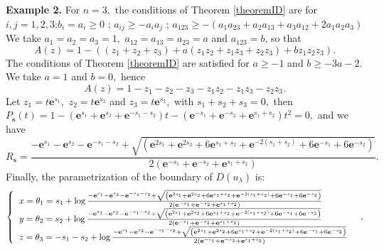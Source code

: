 \documentclass[a4paper,oneside,notitlepage]{article}%
\begin{document}
\textbf{Example 2. }For $n=3,$ the conditions of Theorem \ref{theoremID} are
for $i,j=1,2,3$:\newline$b_{i}=a_{i}\geqslant0$ ; $a_{ij}\geqslant-a_{i}a_{j}$
; $a_{123}\geqslant-\left(  a_{1}a_{23}+a_{2}a_{13}+a_{3}a_{12}+2a_{1}%
a_{2}a_{3}\right)  $\newline We take $a_{1}=a_{2}=a_{3}=1,$ $a_{12}%
=a_{13}=a_{23}=a$ and $a_{123}=b$, so that
\[
A\left(  z\right)  =1-\left(  \left(  z_{1}+z_{2}+z_{3}\right)  +a\left(
z_{1}z_{2}+z_{1}z_{3}+z_{2}z_{3}\right)  +bz_{1}z_{2}z_{3}\right)  .
\]
The conditions of Theorem \ref{theoremID} are satisfied for $a\geqslant-1$ and
$b\geqslant-3a-2.$ We take $a=1$ and $b=0,$ hence
\[
A\left(  z\right)  =1-z_{1}-z_{2}-z_{3}-z_{1}z_{2}-z_{1}z_{3}-z_{2}z_{3}.
\]
Let $z_{1}=t\mathbf{e}^{s_{1}},$ $z_{2}=t\mathbf{e}^{s_{2}}$ and
$z_{3}=t\mathbf{e}^{s_{2}},$ with $s_{1}+s_{2}+s_{3}=0,$ then $P_{\mathbf{s}%
}\left(  t\right)  =1-\left(  \mathbf{e}^{s_{1}}+\mathbf{e}^{s_{2}}%
+\mathbf{e}^{-s_{1}-s_{2}}\right)  t-\left(  \mathbf{e}^{-s_{1}}%
+\mathbf{e}^{-s_{2}}+\mathbf{e}^{s_{1}+s_{2}}\right)  t^{2}=0,$ and we have
\[
R_{\mathbf{s}}=\frac{-\mathbf{e}^{s_{1}}-\mathbf{e}^{s_{2}}-\mathbf{e}%
^{-s_{1}-s_{2}}+\sqrt{\left(  \mathbf{e}^{2s_{1}}+\mathbf{e}^{2s_{2}%
}+6\mathbf{e}^{s_{1}+s_{2}}+\mathbf{e}^{-2(s_{1}+s_{2})}+6\mathbf{e}^{-s_{1}%
}+6\mathbf{e}^{-s_{2}}\right)  }}{2\left(  \mathbf{e}^{-s_{1}}+\mathbf{e}%
^{-s_{2}}+\mathbf{e}^{s_{1}+s_{2}}\right)  }.
\]
Finally, the parametrization of the boundary of $D\left(  u_{\lambda}\right)
$ is:%
\[
\left\{
\begin{tabular}
[c]{l}%
$x=\theta_{1}=s_{1}+\log\frac{-\mathbf{e}^{s_{1}}-\mathbf{e}^{s_{2}%
}-\mathbf{e}^{-s_{1}-s_{2}}+\sqrt{\left(  \mathbf{e}^{2s_{1}}+\mathbf{e}%
^{2s_{2}}+6\mathbf{e}^{s_{1}+s_{2}}+\mathbf{e}^{-2(s_{1}+s_{2})}%
+6\mathbf{e}^{-s_{1}}+6\mathbf{e}^{-s_{2}}\right)  }}{2\left(  \mathbf{e}%
^{-s_{1}}+\mathbf{e}^{-s_{2}}+\mathbf{e}^{s_{1}+s_{2}}\right)  }$\\
$y=\theta_{2}=s_{2}+\log\frac{-\mathbf{e}^{s_{1}}-\mathbf{e}^{s_{2}%
}-\mathbf{e}^{-s_{1}-s_{2}}+\sqrt{\left(  \mathbf{e}^{2s_{1}}+\mathbf{e}%
^{2s_{2}}+6\mathbf{e}^{s_{1}+s_{2}}+\mathbf{e}^{-2(s_{1}+s_{2})}%
+6\mathbf{e}^{-s_{1}}+6\mathbf{e}^{-s_{2}}\right)  }}{2\left(  \mathbf{e}%
^{-s_{1}}+\mathbf{e}^{-s_{2}}+\mathbf{e}^{s_{1}+s_{2}}\right)  }$\\
$z=\theta_{3}=-s_{1}-s_{2}+\log\frac{-\mathbf{e}^{s_{1}}-\mathbf{e}^{s_{2}%
}-\mathbf{e}^{-s_{1}-s_{2}}+\sqrt{\left(  \mathbf{e}^{2s_{1}}+\mathbf{e}%
^{2s_{2}}+6\mathbf{e}^{s_{1}+s_{2}}+\mathbf{e}^{-2(s_{1}+s_{2})}%
+6\mathbf{e}^{-s_{1}}+6\mathbf{e}^{-s_{2}}\right)  }}{2\left(  \mathbf{e}%
^{-s_{1}}+\mathbf{e}^{-s_{2}}+\mathbf{e}^{s_{1}+s_{2}}\right)  }$%
\end{tabular}
\ \ \right.  ,
\]
\end{document}
